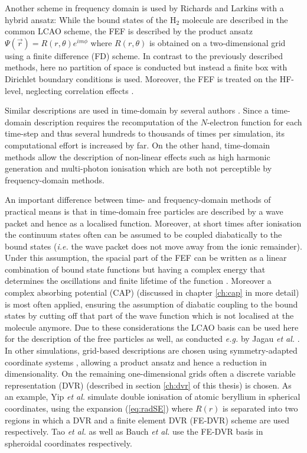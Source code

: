 {Another scheme in frequency domain is used by Richards and Larkins \cite{richardsFD} with a hybrid ansatz: While the bound states of the H$_2$ molecule are described in the common LCAO scheme, the FEF is described by the product ansatz $\Psi(\vec{r}) = R(r,\theta) e^{im\phi}$ where $R(r,\theta)$ is obtained on a two-dimensional grid using a finite difference (FD) scheme.
In contrast to the previously described methods, here no partition of space is conducted but instead a finite box with Dirichlet boundary conditions is used.
Moreover, the FEF is treated on the HF-level, neglecting correlation effects \cite{richardsFD}.

Similar descriptions are used in time-domain by several authors \cite{CAPccEOM, bauch1, taoDVR}.
Since a time-domain description requires the recomputation of the $N$-electron function for each time-step and thus several hundreds to thousands of times per simulation, its computational effort is increased by far.
On the other hand, time-domain methods allow the description of non-linear effects such as high harmonic generation and multi-photon ionisation \cite{as2} which are both not perceptible by frequency-domain methods.

An important difference between time- and frequency-domain methods of practical means is that in time-domain free particles are described by a wave packet and hence as a localised function.
Moreover, at short times after ionisation the continuum states often can be assumed to be coupled diabatically to the bound states (\textit{i.e.} the wave packet does not move away from the ionic remainder).
Under this assumption, the spacial part of the FEF can be written as a linear combination of bound state functions but having a complex energy that determines the oscillations and finite lifetime of the function \cite{CAPccEOM}.
Moreover a complex absorbing potential (CAP) (discussed in chapter \ref{ch:cap} in more detail) is most often applied, ensuring the assumption of diabatic coupling to the bound states by cutting off that part of the wave function which is not localised at the molecule anymore.
Due to these considerations the LCAO basis can be used here for the description of the free particles as well, as conducted \textit{e.g.} by Jagau \textit{et al.} \cite{CAPccEOM}.
In other simulations, grid-based descriptions are chosen using symmetry-adapted coordinate systems \cite{radau,jacobi, hyperspheric,taoDVR}, allowing a product ansatz and hence a reduction in dimensionality.
On the remaining one-dimensional grids often a discrete variable representation (DVR) (described in section \ref{ch:dvr} of this thesis) is chosen.
As an example, Yip \textit{et al.} \cite{yipDVR} simulate double ionisation of atomic beryllium in spherical coordinates, using the expansion (\ref{eq:radSE}) where $R(r)$ is separated into two regions in which a DVR and a finite element DVR (FE-DVR) scheme are used respectively.
Tao \textit{et al.} \cite{taoDVR} as well as Bauch \textit{et al.} \cite{bauch1, bauch2} use the FE-DVR basis in spheroidal coordinates respectively.

}
